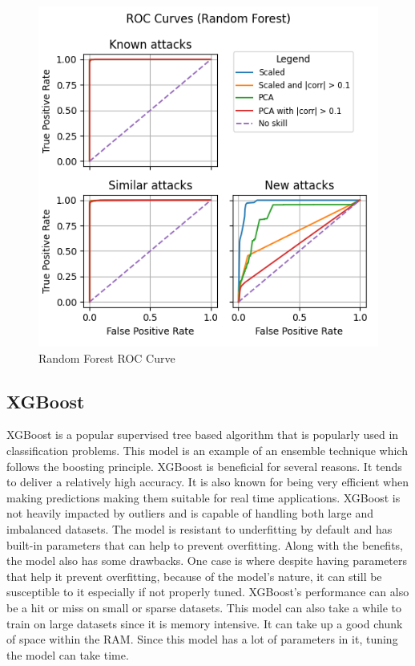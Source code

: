 \begin{figure}
    \centering
    \includegraphics[width=\linewidth]{figures/Random Forest_roc_all_small.png}
    \caption{Random Forest ROC Curve}
    \label{fig:randomforest_roc}
\end{figure}

\subsection{XGBoost}
XGBoost is a popular supervised tree based algorithm that is popularly used in classification problems. This model is an example of an ensemble technique which follows the boosting principle. XGBoost is beneficial for several reasons. It tends to deliver a relatively high accuracy. It is also known for being very efficient when making predictions making them suitable for real time applications. XGBoost is not heavily impacted by outliers and is capable of handling both large and imbalanced datasets. The model is resistant to underfitting by default and has built-in parameters that can help to prevent overfitting. Along with the benefits, the model also has some drawbacks. One case is where despite having parameters that help it prevent overfitting, because of the model's nature, it can still be susceptible to it especially if not properly tuned. XGBoost's performance can also be a hit or miss on small or sparse datasets. This model can also take a while to train on large datasets since it is memory intensive. It can take up a good chunk of space within the RAM. Since this model has a lot of parameters in it, tuning the model can take time.  


